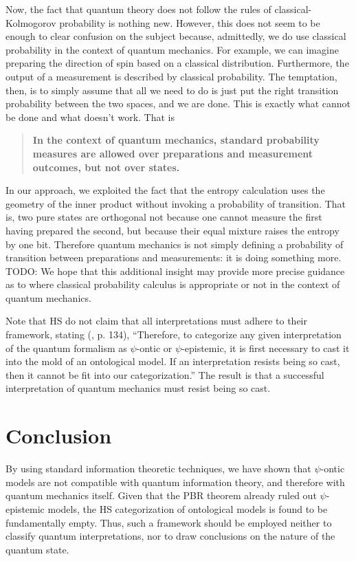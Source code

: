 \documentclass[10pt,twocolumn, nofootinbib]{revtex4-2}
\begin{document}
Now, the fact that quantum theory does not follow the rules of classical-Kolmogorov probability is nothing new\cite{Werner:2014}. However, this does not seem to be enough to clear confusion on the subject because, admittedly, we do use classical probability in the context of quantum mechanics. For example, we can imagine preparing the direction of spin based on a classical distribution. Furthermore, the output of a measurement is described by classical probability. The temptation, then, is to simply assume that all we need to do is just put the right transition probability between the two spaces, and we are done. This is exactly what cannot be done and what doesn't work. That is
\begin{quote}
	\textbf{In the context of quantum mechanics, standard probability measures are allowed over preparations and measurement outcomes, but not over states.}
\end{quote}
In our approach, we exploited the fact that the entropy calculation uses the geometry of the inner product without invoking a probability of transition. That is, two pure states are orthogonal not because one cannot measure the first having prepared the second, but because their equal mixture raises the entropy by one bit. Therefore quantum mechanics is not simply defining a probability of transition between preparations and measurements: it is doing something more. TODO: We hope that this additional insight may provide more precise guidance as to where classical probability calculus is appropriate or not in the context of quantum mechanics.

Note that HS do not claim that all interpretations must adhere to their framework, stating (\cite{Harrigan:2010}, p. 134), ``Therefore, to categorize any given interpretation of the quantum formalism as $\psi$-ontic or $\psi$-epistemic, it is first necessary to cast it into the mold of an ontological model. If an interpretation resists being so cast, then it cannot be fit into our categorization.'' The result is that a successful interpretation of quantum mechanics must resist being so cast.

\section{Conclusion}

By using standard information theoretic techniques, we have shown that $\psi$-ontic models are not compatible with quantum information theory, and therefore with quantum mechanics itself. Given that the PBR theorem already ruled out $\psi$-epistemic models, the HS categorization of ontological models is found to be fundamentally empty. Thus, such a framework should be employed neither to classify quantum interpretations, nor to draw conclusions on the nature of the quantum state.
\end{document}
